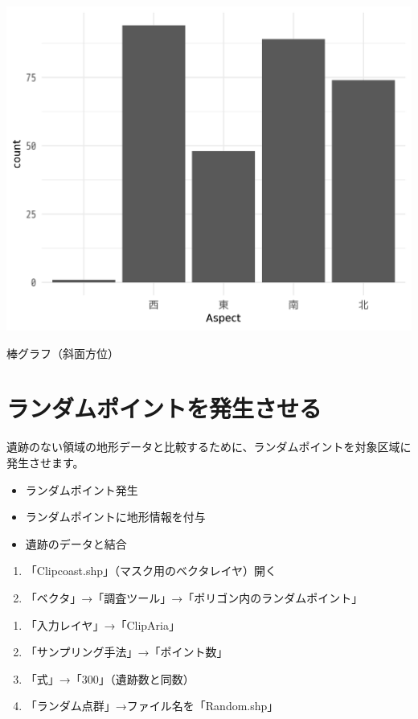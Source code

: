 \documentclass[14Q,twocolumn]{jsarticle}
\makeatletter
\newenvironment{figurehere}
  {\def\@captype{figure}}
  {}
\makeatother
\begin{document}
\begin{figurehere}
\centering
\includegraphics[width=0.8\linewidth]{R_graph/graph04.png}
\caption{棒グラフ（斜面方位）}
\end{figurehere}

\section{ランダムポイントを発生させる}
遺跡のない領域の地形データと比較するために、ランダムポイントを対象区域に発生させます。

\begin{itemize}
\item ランダムポイント発生
\item ランダムポイントに地形情報を付与
\item 遺跡のデータと結合
\end{itemize}


\begin{enumerate}
\item 「Clipcoast.shp」（マスク用のベクタレイヤ）開く
\item 「ベクタ」→「調査ツール」→「ポリゴン内のランダムポイント」
\end{enumerate}

\begin{enumerate}
\item 「入力レイヤ」→「ClipAria」
\item 「サンプリング手法」→「ポイント数」
\item 「式」→「300」（遺跡数と同数）
\item 「ランダム点群」→ファイル名を「Random.shp」
\end{enumerate}
\end{document}
